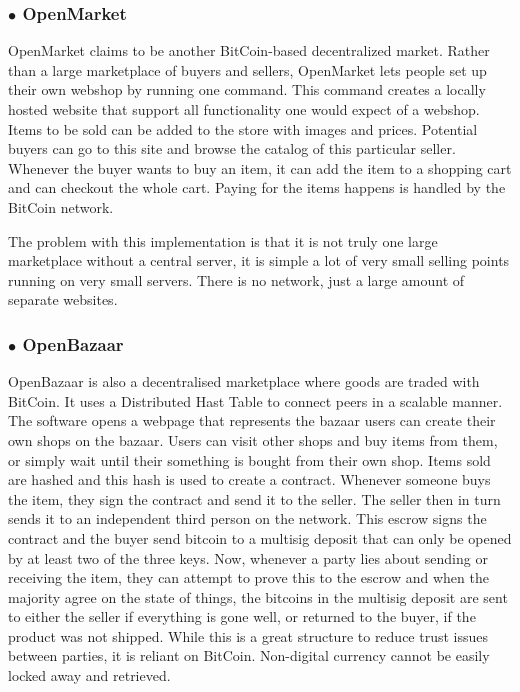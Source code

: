\subsubsection*{$\bullet$ OpenMarket}
OpenMarket \cite{openmarket} claims to be another BitCoin-based decentralized market.
Rather than a large marketplace of buyers and sellers, OpenMarket lets people set up their own webshop by running one command.
This command creates a locally hosted website that support all functionality one would expect of a webshop.
Items to be sold can be added to the store with images and prices. 
Potential buyers can go to this site and browse the catalog of this particular seller.
Whenever the buyer wants to buy an item, it can add the item to a shopping cart and can checkout the whole cart.
Paying for the items happens is handled by the BitCoin network.

The problem with this implementation is that it is not truly one large marketplace without a central server, it is simple a lot of very small selling points running on very small servers.
There is no network, just a large amount of separate websites.
\subsubsection*{$\bullet$ OpenBazaar}
OpenBazaar \cite{bazaar} is also a decentralised marketplace where goods are traded with BitCoin.
It uses a Distributed Hast Table to connect peers in a scalable manner.
The software opens a webpage that represents the bazaar users can create their own shops on the bazaar.
Users can visit other shops and buy items from them, or simply wait until their something is bought from their own shop.
Items sold are hashed and this hash is used to create a contract.
Whenever someone buys the item, they sign the contract and send it to the seller.
The seller then in turn sends it to an independent third person on the network.
This escrow signs the contract and the buyer send bitcoin to a multisig deposit that can only be opened by at least two of the three keys.
Now, whenever a party lies about sending or receiving the item, they can attempt to prove this to the escrow and when the majority agree on the state of things, the bitcoins in the multisig deposit are sent to either the seller if everything is gone well, or returned to the buyer, if the product was not shipped.
While this is a great structure to reduce trust issues between parties, it is reliant on BitCoin. Non-digital currency cannot be easily locked away and retrieved.